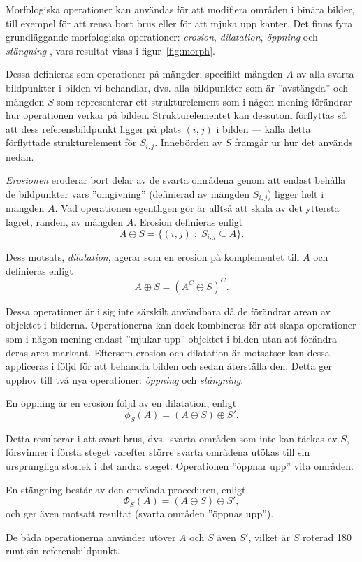 \documentclass[../rapport_MVEX01-11-05]{subfiles}
\begin{document}
Morfologiska operationer kan användas för att modifiera områden i
binära bilder, till exempel för att rensa bort brus eller för att
mjuka upp kanter. Det finns fyra grundläggande morfologiska
operationer: \emph{erosion}, \emph{dilatation}, \emph{öppning} och
\emph{stängning} \cite[s.~25]{Rudemo09}, vars resultat visas i figur~\ref{fig:morph}.

Dessa definieras som operationer på mängder; specifikt mängden $A$
av alla svarta bildpunkter i bilden vi behandlar, dvs. alla bildpunkter som är
''avstängda'' och mängden $S$ som representerar ett strukturelement
som i någon mening förändrar hur operationen verkar på bilden.
Strukturelementet kan dessutom förflyttas så att dess referensbildpunkt
ligger på plats $(i,j)$ i bilden --- kalla detta förflyttade
strukturelement för $S_{i,j}$. Innebörden av $S$ framgår ur hur det används
nedan.

\emph{Erosionen} eroderar bort delar av de svarta områdena genom
att endast behålla de bildpunkter vars ''omgivning'' (definierad av mängden
$S_{i,j}$) ligger helt i mängden $A$. Vad operationen egentligen gör är alltså
att skala av det yttersta lagret, randen, av mängden $A$. Erosion definieras enligt
\begin{equation*}
  A\ominus S = \{(i,j)\;:\;S_{i,j}\subseteq A\}.
\end{equation*}

Dess motsats, \emph{dilatation}, agerar som
en erosion på komplementet till $A$ och definieras enligt
\begin{equation*}
  A\oplus S = (A^C\ominus S)^C.
\end{equation*}

Dessa operationer är i sig inte särskilt användbara då de förändrar
arean av objektet i bilderna. Operationerna kan dock kombineras för
att skapa operationer som i någon mening endast 
''mjukar upp'' objektet i bilden utan att förändra deras area markant.
Eftersom erosion och dilatation är motsatser kan dessa appliceras i
följd för att behandla bilden och
sedan återställa den. Detta ger upphov till två nya operationer:
\emph{öppning} och \emph{stängning}.

En öppning är en erosion följd av en dilatation, enligt
\begin{equation*}
  \phi_S(A)=(A\ominus S)\oplus S'.
\end{equation*}

Detta resulterar i att svart brus, dvs.~svarta områden som inte kan täckas
av $S$, försvinner i
första steget varefter större svarta områdena utökas till sin ursprungliga
storlek i det andra
steget. Operationen ''öppnar upp'' vita områden.

En stängning består av den omvända proceduren, enligt
\begin{equation*}
  \Phi_S(A)=(A\oplus S)\ominus S',
\end{equation*}
och ger även motsatt resultat (svarta områden ''öppnas upp'').

De
båda operationerna använder utöver $A$ och $S$ även $S'$, vilket är
$S$ roterad 180\textdegree{} runt sin referensbildpunkt.
\end{document}
